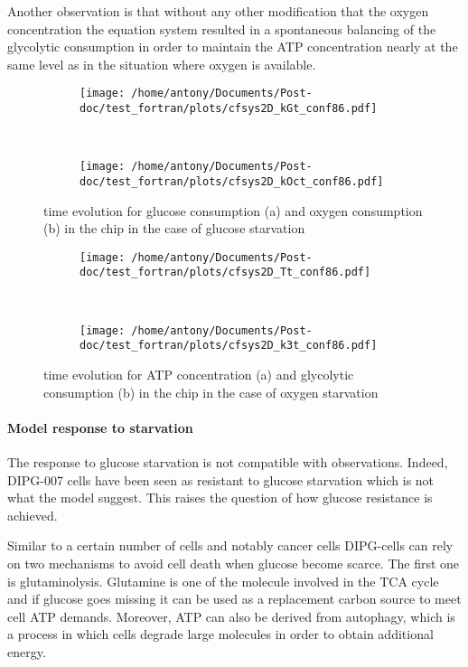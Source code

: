 \documentclass[11pt,a4paper]{article}
\begin{document}
Another observation is that without any other modification that the oxygen concentration the equation system resulted in a spontaneous balancing of the glycolytic consumption in order to maintain the ATP concentration nearly at the same level as in the situation where oxygen is available.

\begin{figure}[ht!]
	\begin{subfigure}{0.45\textwidth}
	\centering
	\texttt{[image: /home/antony/Documents/Post-doc/test\_fortran/plots/cfsys2D\_kGt\_conf86.pdf]}
	\caption{ \label{kGt_conf86}}
	\end{subfigure}
	~~
	\begin{subfigure}{0.45\textwidth}
	\texttt{[image: /home/antony/Documents/Post-doc/test\_fortran/plots/cfsys2D\_kOct\_conf86.pdf]}
		\caption{ \label{kOct_conf86}}
	\end{subfigure}
	\caption{time evolution for glucose consumption (a) and  oxygen consumption (b) in the chip in the case of glucose starvation \label{tconf86}}
\end{figure}

\begin{figure}[ht!]
	\begin{subfigure}{0.45\textwidth}
	\centering
	\texttt{[image: /home/antony/Documents/Post-doc/test\_fortran/plots/cfsys2D\_Tt\_conf86.pdf]}
	\caption{ \label{Tt_conf86}}
	\end{subfigure}
	~~
	\begin{subfigure}{0.45\textwidth}
	\texttt{[image: /home/antony/Documents/Post-doc/test\_fortran/plots/cfsys2D\_k3t\_conf86.pdf]}
		\caption{ \label{k3t_conf86}}
	\end{subfigure}
	\caption{time evolution for ATP concentration (a) and  glycolytic consumption (b) in the chip in the case of oxygen starvation \label{Btconf86}}
\end{figure}

\paragraph{Model response to starvation}
The response to glucose starvation is not compatible with observations. Indeed, DIPG-007 cells have been seen as resistant to glucose starvation which is not what the model suggest. This raises the question of how glucose resistance is achieved.

Similar to a certain number of cells and notably cancer cells DIPG-cells can rely on two mechanisms to avoid cell death when glucose become scarce. The first one is glutaminolysis. Glutamine is one of the molecule involved in the TCA cycle and if glucose goes missing it can be used as a replacement carbon source to meet cell ATP demands. Moreover, ATP can also be derived from autophagy, which is a process in which cells degrade large molecules in order to obtain additional energy.
\end{document}
